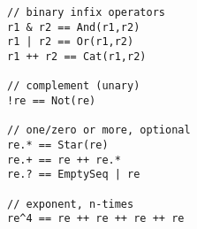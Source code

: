 \begin{lstlisting}[style=scalaioScala]
// binary infix operators
r1 & r2 == And(r1,r2)
r1 | r2 == Or(r1,r2)
r1 ++ r2 == Cat(r1,r2)

// complement (unary)
!re == Not(re)

// one/zero or more, optional
re.* == Star(re)
re.+ == re ++ re.*
re.? == EmptySeq | re

// exponent, n-times
re^4 == re ++ re ++ re ++ re
\end{lstlisting}
